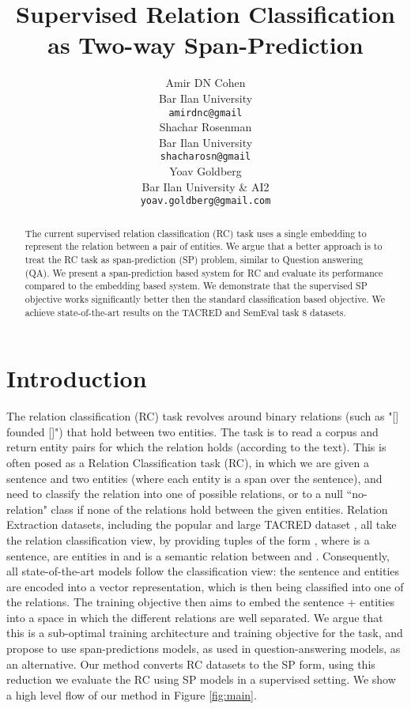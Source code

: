 \documentclass[11pt]{article}
\title{Supervised Relation Classification as Two-way Span-Prediction}
\author{Amir DN Cohen \\
  Bar Ilan University \\
  \texttt{amirdnc@gmail} \\\And
  Shachar Rosenman \\
  Bar Ilan University \\
  \texttt{shacharosn@gmail}\\\And
  Yoav Goldberg \\
  Bar Ilan University \& AI2\\
  \texttt{yoav.goldberg@gmail.com} \\}
\date{}
\begin{document}
\maketitle
\begin{abstract}
The current supervised relation classification (RC) task uses a single embedding to represent the relation between a pair of entities. We argue that a better approach is to treat the RC task as span-prediction (SP) problem, similar to Question answering (QA). We present a span-prediction based system for RC and evaluate its performance compared to the embedding based system. We demonstrate that the supervised SP objective works significantly better then the standard classification based objective. We achieve state-of-the-art results on the TACRED and SemEval task 8 datasets.
\end{abstract}
\section{Introduction}
The relation classification (RC) task revolves around binary relations (such as "[] founded []") that hold between two entities. The task is to read a corpus and return entity pairs  for which the relation holds (according to the text). This is often posed as a Relation Classification task (RC), in which we are given a sentence and two entities (where each entity is a span over the sentence), and need to classify the relation into one of  possible relations, or to a null ``no-relation" class if none of the  relations hold between the given entities. Relation Extraction datasets, including the popular and large TACRED dataset \cite{Zhang}, all take the relation classification view, by providing tuples of the form , where  is a sentence,  are entities in  and  is a semantic relation between  and . Consequently, all state-of-the-art models follow the classification view: the sentence and entities are encoded into a vector representation, which is then being classified into one of the  relations. The training objective then aims to embed the sentence + entities into a space in which the different relations are well separated.
We argue that this is a sub-optimal training architecture and training objective for the task, and propose to use span-predictions models, as used in question-answering models, as an alternative.
Our method converts RC datasets to the SP form, using this reduction we evaluate the RC using SP models in a supervised setting. We show a high level flow of our method in Figure \ref{fig:main}.
\end{document}
